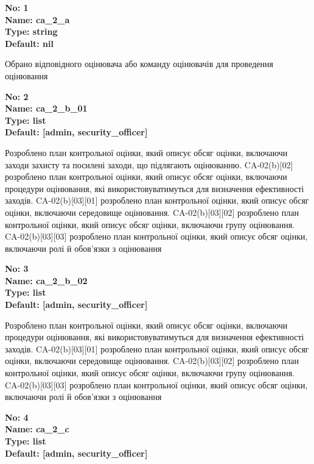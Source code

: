\documentclass{article}
\begin{document}
\vspace{10pt}
{\footnotesize\bfseries
No: 1\\
Name: ca\_\allowbreak{}2\_\allowbreak{}a\\
Type: string\\
Default: nil
}

{\footnotesize Обрано відповідного оцінювача або команду оцінювачів для проведення оцінювання}


{\footnotesize\bfseries
No: 2\\
Name: ca\_\allowbreak{}2\_\allowbreak{}b\_\allowbreak{}01\\
Type: list\\
Default: [\textquotedbl{}admin\textquotedbl{}, \textquotedbl{}security\_\allowbreak{}officer\textquotedbl{}]
}

{\footnotesize Розроблено план контрольної оцінки, який описує обсяг оцінки, включаючи заходи захисту та посилені заходи, що підлягають оцінюванню. CA-02(b)[02] розроблено план контрольної оцінки, який описує обсяг оцінки, включаючи процедури оцінювання, які використовуватимуться для визначення ефективності заходів. CA-02(b)[03][01] розроблено план контрольної оцінки, який описує обсяг оцінки, включаючи середовище оцінювання. CA-02(b)[03][02] розроблено план контрольної оцінки, який описує обсяг оцінки, включаючи групу оцінювання. CA-02(b)[03][03] розроблено план контрольної оцінки, який описує обсяг оцінки, включаючи ролі й обов'язки з оцінювання}


{\footnotesize\bfseries
No: 3\\
Name: ca\_\allowbreak{}2\_\allowbreak{}b\_\allowbreak{}02\\
Type: list\\
Default: [\textquotedbl{}admin\textquotedbl{}, \textquotedbl{}security\_\allowbreak{}officer\textquotedbl{}]
}

{\footnotesize Розроблено план контрольної оцінки, який описує обсяг оцінки, включаючи процедури оцінювання, які використовуватимуться для визначення ефективності заходів. CA-02(b)[03][01] розроблено план контрольної оцінки, який описує обсяг оцінки, включаючи середовище оцінювання. CA-02(b)[03][02] розроблено план контрольної оцінки, який описує обсяг оцінки, включаючи групу оцінювання. CA-02(b)[03][03] розроблено план контрольної оцінки, який описує обсяг оцінки, включаючи ролі й обов'язки з оцінювання}


{\footnotesize\bfseries
No: 4\\
Name: ca\_\allowbreak{}2\_\allowbreak{}c\\
Type: list\\
Default: [\textquotedbl{}admin\textquotedbl{}, \textquotedbl{}security\_\allowbreak{}officer\textquotedbl{}]
}
\end{document}
